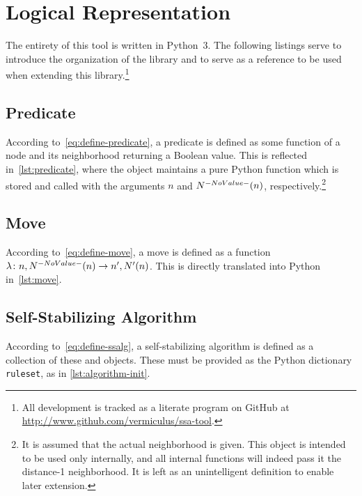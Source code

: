 \section{Logical Representation}
\label{sec:logic-repr}

The entirety of this tool is written in Python~3.
The following listings serve to introduce the organization of the library and
  to serve as a reference to be used when extending this library.\footnote{%
    All development is tracked as a literate program on GitHub
    at \url{http://www.github.com/vermiculus/ssa-tool}.}

\subsection{Predicate}
\label{sec:logic-repr:predicate}

According to~\eqref{eq:define-predicate},
  a \gls{predicate} is defined as some function of
  a node and its neighborhood returning a Boolean value.
This is reflected in~\autoref{lst:predicate},
  where the  object maintains a pure Python function
  which is stored and called with the arguments $n$ and $\OpenNeighborhood{n}$,
  respectively.\footnote{%
    It is assumed that the actual neighborhood is given.
    This object is intended to be used only internally,
      and all internal functions will indeed pass it the distance-1 neighborhood.
    It is left as an unintelligent definition to enable later extension.}


\subsection{Move}
\label{sec:logic-repr:move}

According to~\eqref{eq:define-move},
  a \gls{move} is defined as a function
  $\Function{n, \OpenNeighborhood{n}}{n^\prime, \OpenNeighborhood[\prime]{n}}$.
This is directly translated into Python in~\autoref{lst:move}.


\subsection{Self-Stabilizing Algorithm}
\label{sec:logic-repr:self-stab-algor}

According to~\eqref{eq:define-ssalg},
  a self-stabilizing algorithm is defined as a collection
  of these  and  objects.
These must be provided as the Python dictionary \lstinline|ruleset|,
  as in \autoref{lst:algorithm-init}.



